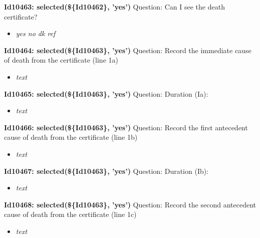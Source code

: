 \documentclass{article}%
\begin{document}
\textbf{Id10463: selected(\$\{Id10462\}, 'yes')\newline%
}%
Question: Can I see the death certificate?\newline%
%
\begin{itemize}%
\item%
\textit{yes\newline%
 no\newline%
 dk\newline%
 ref\newline%
}%
\end{itemize}%
\textbf{Id10464: selected(\$\{Id10463\}, 'yes')\newline%
}%
Question: Record the immediate cause of death from the certificate (line 1a)\newline%
%
\begin{itemize}%
\item%
\textit{text\newline%
}%
\end{itemize}%
\textbf{Id10465: selected(\$\{Id10463\}, 'yes')\newline%
}%
Question: Duration (Ia):\newline%
%
\begin{itemize}%
\item%
\textit{text\newline%
}%
\end{itemize}%
\textbf{Id10466: selected(\$\{Id10463\}, 'yes')\newline%
}%
Question: Record the first antecedent cause of death from the certificate  (line 1b)\newline%
%
\begin{itemize}%
\item%
\textit{text\newline%
}%
\end{itemize}%
\textbf{Id10467: selected(\$\{Id10463\}, 'yes')\newline%
}%
Question: Duration (Ib):\newline%
%
\begin{itemize}%
\item%
\textit{text\newline%
}%
\end{itemize}%
\textbf{Id10468: selected(\$\{Id10463\}, 'yes')\newline%
}%
Question: Record the second antecedent cause of death from the certificate (line 1c)\newline%
%
\begin{itemize}%
\item%
\textit{text\newline%
}%
\end{itemize}%
\end{document}
